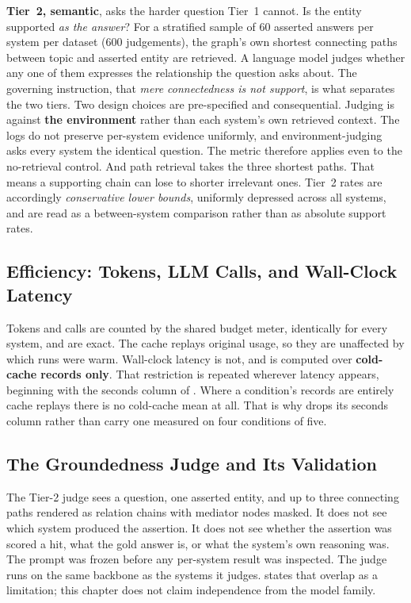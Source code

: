 \textbf{Tier~2, semantic}, asks the harder question Tier~1 cannot. Is the entity
supported \emph{as the answer}? For a stratified sample of $60$ asserted answers
per system per dataset ($600$ judgements), the graph's own shortest connecting
paths between topic and asserted entity are retrieved. A language model judges
whether any one of them expresses the relationship the question asks about. The
governing instruction, that \emph{mere connectedness is not support}, is what
separates the two tiers. Two design choices are pre-specified and consequential.
Judging is against \textbf{the environment} rather than each system's own
retrieved context. The logs do not preserve per-system evidence uniformly, and
environment-judging asks every system the identical question. The metric
therefore applies even to the no-retrieval control. And path retrieval takes the
three shortest paths. That means a supporting chain can lose to shorter
irrelevant ones. Tier~2 rates are accordingly \emph{conservative lower bounds},
uniformly depressed across all systems, and are read as a between-system
comparison rather than as absolute support rates.

\subsection{Efficiency: Tokens, LLM Calls, and Wall-Clock Latency}

Tokens and calls are counted by the shared budget meter, identically for
every system, and are exact. The cache replays original usage, so
they are unaffected by which runs were warm. Wall-clock latency is not, and is
computed over \textbf{cold-cache records only}. That restriction is repeated
wherever latency appears, beginning with the seconds column of
. Where a condition's records are entirely cache replays
there is no cold-cache mean at all. That is why  drops its
seconds column rather than carry one measured on four conditions of five.

\subsection{The Groundedness Judge and Its Validation}\label{sec:judge}

The Tier-2 judge sees a question, one asserted entity, and up to three
connecting paths rendered as relation chains with mediator nodes masked. It does
not see which system produced the assertion. It does not see whether the
assertion was scored a hit, what the gold answer is, or what the system's own
reasoning was. The prompt was frozen before any per-system result was inspected.
The judge runs on the same backbone as the systems it judges. 
states that overlap as a limitation; this chapter does not claim independence
from the model family.

